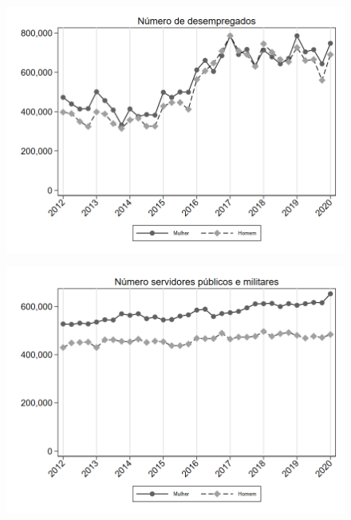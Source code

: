 \begin{frame}[label=_composicao_demografica_genero_n_de_desemprego]{}
\textit{\hyperlink{_composicao_demografica_genero}{}}
\begin{figure}
  \centering
  \includegraphics[width=1.0\linewidth]{../../analysis/output/composicao_demografica/genero/_composicao_demografica_genero_n_de_desemprego.png}
  \caption{}
  \label{fig:_composicao_demografica_genero_n_de_desemprego}
\end{figure}
\end{frame}


\begin{frame}[label=_composicao_demografica_genero_n_militar]{}
\textit{\hyperlink{_composicao_demografica_genero}{}}
\begin{figure}
  \centering
  \includegraphics[width=1.0\linewidth]{../../analysis/output/composicao_demografica/genero/_composicao_demografica_genero_n_militar.png}
  \caption{}
  \label{fig:_composicao_demografica_genero_n_militar}
\end{figure}
\end{frame}


